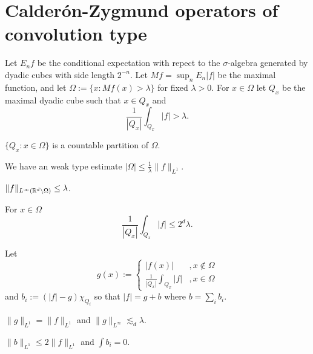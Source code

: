 \documentclass{../note}
\begin{document}
\section{Calder\'on-Zygmund operators of convolution type}
\begin{prb}
Let $E_nf$ be the conditional expectation with repect to the $\sigma$-algebra generated by dyadic cubes with side length $2^{-n}$.
Let $Mf=\sup_nE_n|f|$ be the maximal function, and let $\Omega:=\{x:Mf(x)>\lambda\}$ for fixed $\lambda>0$.
For $x\in\Omega$ let $Q_x$ be the maximal dyadic cube such that $x\in Q_x$ and
\[\frac1{|Q_x|}\int_{Q_x}|f|>\lambda.\]
\begin{parts}
\item
$\{Q_x:x\in\Omega\}$ is a countable partition of $\Omega$.
\item
We have an weak type estimate $|\Omega|\le\frac1\lambda\|f\|_{L^1}$.
\item
$\|f\|_{L^\infty(\mathbb{R}^d\setminus\Omega)}\le\lambda$.
\item
For $x\in\Omega$
\[\frac1{|Q_x|}\int_{Q_x}|f|\le2^d\lambda.\]
\end{parts}
\end{prb}

\begin{prb}
Let
\[g(x):=\begin{cases}|f(x)|&,x\notin\Omega\\\frac1{|Q_x|}\int_{Q_x}|f|&,x\in\Omega\end{cases}\]
and $b_i:=(|f|-g)\chi_{Q_i}$ so that $|f|=g+b$ where $b=\sum_ib_i$.
\begin{parts}
\item $\|g\|_{L^1}=\|f\|_{L^1}$ and $\|g\|_{L^\infty}\lesssim_d\lambda$.
\item $\|b\|_{L^1}\le2\|f\|_{L^1}$ and $\int b_i=0$.
\end{parts}
\end{prb}
\begin{pf}

\end{pf}
\end{document}
